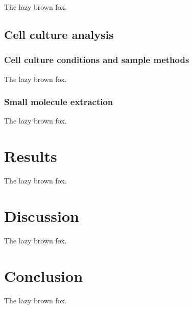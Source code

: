 \begin{refsection}
The lazy brown fox.

\subsection{Cell culture analysis}

\subsubsection{Cell culture conditions and sample methods}

The lazy brown fox.

\subsubsection{Small molecule extraction}

The lazy brown fox.

\section{Results}
The lazy brown fox.

\section{Discussion}
The lazy brown fox.

\section{Conclusion}
The lazy brown fox.


\printbibliography[heading=subbibliography]

\end{refsection}
